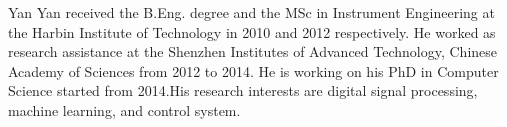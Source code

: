 \documentclass[journal]{IEEEtran}
\begin{document}








% 

\begin{IEEEbiography}{Yan Yan}
received the B.Eng. degree and the MSc in Instrument Engineering at the Harbin Institute of Technology in 2010 and 2012 respectively. He worked as research assistance at the Shenzhen Institutes of Advanced Technology, Chinese Academy of Sciences from 2012 to 2014. He is working on his PhD in Computer Science started from 2014.His research interests are digital signal processing, machine learning, and control system.
\end{IEEEbiography}
\end{document}
